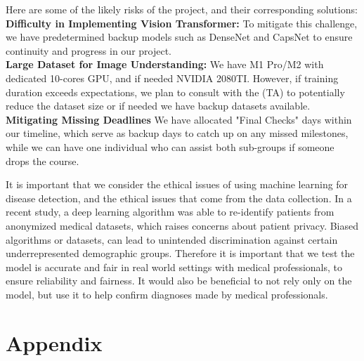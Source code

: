 \documentclass{article}
\begin{document}
Here are some of the likely risks of the project, and their corresponding solutions: \\
\textbf{Difficulty in Implementing Vision Transformer:} To mitigate this challenge, we have predetermined backup models such as DenseNet and CapsNet to ensure continuity and progress in our project. \\
\textbf{Large Dataset for Image Understanding:} We have M1 Pro/M2 with dedicated 10-cores GPU, and if needed NVIDIA 2080TI. However, if training duration exceeds expectations, we plan to consult with the (TA) to potentially reduce the dataset size or if needed we have backup datasets available. \\
\textbf{Mitigating Missing Deadlines} We have allocated "Final Checks" days within our timeline, which serve as backup days to catch up on any missed milestones, while we can have one individual who can assist both sub-groups if someone drops the course.

It is important that we consider the ethical issues of using machine learning for disease detection, and the ethical issues that come from the data collection. In a recent study, a deep learning algorithm was able to re-identify patients from anonymized medical datasets, which raises concerns about patient privacy. Biased algorithms or datasets, can lead to unintended discrimination against certain underrepresented demographic groups. Therefore it is important that we test the model is accurate and fair in real world settings with medical professionals, to ensure reliability and fairness. It would also be beneficial to not rely only on the model, but use it to help confirm diagnoses made by medical professionals.

\section{Appendix}
\end{document}
